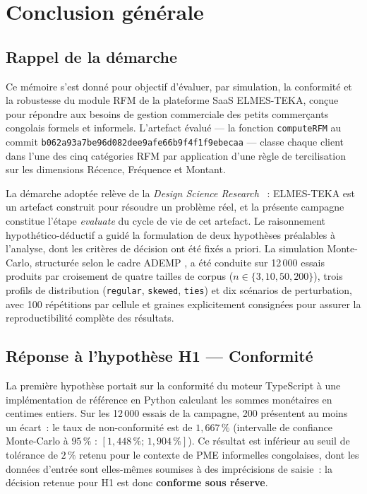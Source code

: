 \chapter*{Conclusion générale}
\label{chap:conclusion}

\section*{Rappel de la démarche}

Ce mémoire s'est donné pour objectif d'évaluer, par simulation, la conformité et la
robustesse du module RFM de la plateforme SaaS ELMES-TEKA, conçue pour répondre aux besoins
de gestion commerciale des petits commerçants congolais formels et informels. L'artefact
évalué — la fonction \texttt{computeRFM} au commit
\texttt{b062a93a7be96d082dee9afe66b9f4f1f9ebecaa} — classe chaque client dans l'une des cinq
catégories RFM par application d'une règle de tercilisation sur les dimensions Récence,
Fréquence et Montant.

La démarche adoptée relève de la \emph{Design Science Research} \citep{Hevner2004,
Peffers2008}~: ELMES-TEKA est un artefact construit pour résoudre un problème réel, et la
présente campagne constitue l'étape \emph{evaluate} du cycle de vie de cet artefact. Le
raisonnement hypothético-déductif a guidé la formulation de deux hypothèses préalables à
l'analyse, dont les critères de décision ont été fixés a priori. La simulation Monte-Carlo,
structurée selon le cadre ADEMP \citep{Morris2019}, a été conduite sur 12\,000 essais
produits par croisement de quatre tailles de corpus ($n \in \{3, 10, 50, 200\}$), trois
profils de distribution (\texttt{regular}, \texttt{skewed}, \texttt{ties}) et dix scénarios
de perturbation, avec 100 répétitions par cellule et graines explicitement consignées pour
assurer la reproductibilité complète des résultats.

\section*{Réponse à l'hypothèse H1 — Conformité}

La première hypothèse portait sur la conformité du moteur TypeScript à une implémentation
de référence en Python calculant les sommes monétaires en centimes entiers. Sur les
12\,000 essais de la campagne, 200 présentent au moins un écart~: le taux de non-conformité
est de $1{,}667\,\%$ (intervalle de confiance Monte-Carlo à $95\,\%$ : $[1{,}448\,\% ;\,
1{,}904\,\%]$). Ce résultat est inférieur au seuil de tolérance de $2\,\%$ retenu pour le
contexte de PME informelles congolaises, dont les données d'entrée sont elles-mêmes soumises
à des imprécisions de saisie~: la décision retenue pour H1 est donc \textbf{conforme sous
réserve}.

